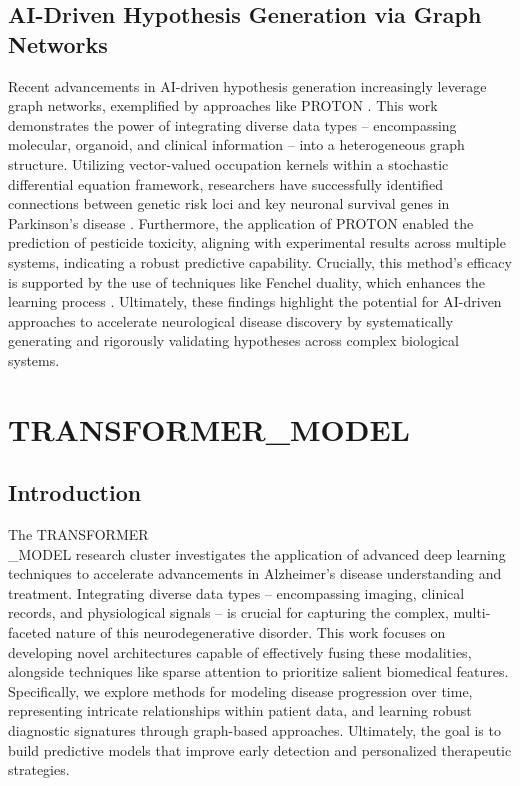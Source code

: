 \documentclass[11pt,a4paper]{article}
\begin{document}
\subsection{AI-Driven Hypothesis Generation via Graph Networks}
Recent advancements in AI-driven hypothesis generation increasingly leverage graph networks, exemplified by approaches like PROTON \cite{arxiv251213724}. This work demonstrates the power of integrating diverse data types – encompassing molecular, organoid, and clinical information – into a heterogeneous graph structure. Utilizing vector-valued occupation kernels within a stochastic differential equation framework, researchers have successfully identified connections between genetic risk loci and key neuronal survival genes in Parkinson’s disease \cite{arxiv251213724}.  Furthermore, the application of PROTON enabled the prediction of pesticide toxicity, aligning with experimental results across multiple systems, indicating a robust predictive capability.  Crucially, this method’s efficacy is supported by the use of techniques like Fenchel duality, which enhances the learning process \cite{arxiv250511622}.  Ultimately, these findings highlight the potential for AI-driven approaches to accelerate neurological disease discovery by systematically generating and rigorously validating hypotheses across complex biological systems.

\section{TRANSFORMER\_MODEL}
\subsection*{Introduction}
The TRANSFORMER\\\_MODEL research cluster investigates the application of advanced deep learning techniques to accelerate advancements in Alzheimer's disease understanding and treatment. Integrating diverse data types – encompassing imaging, clinical records, and physiological signals – is crucial for capturing the complex, multi-faceted nature of this neurodegenerative disorder. This work focuses on developing novel architectures capable of effectively fusing these modalities, alongside techniques like sparse attention to prioritize salient biomedical features. Specifically, we explore methods for modeling disease progression over time, representing intricate relationships within patient data, and learning robust diagnostic signatures through graph-based approaches. Ultimately, the goal is to build predictive models that improve early detection and personalized therapeutic strategies.
\end{document}
